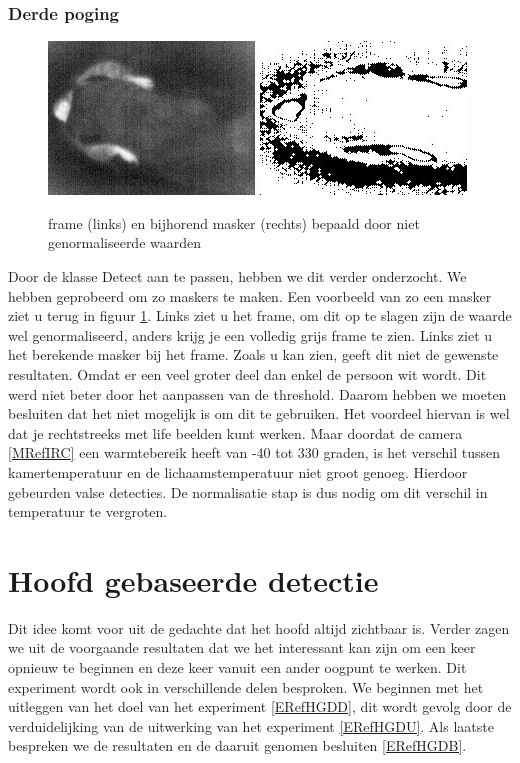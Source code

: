 \subsubsection{Derde poging}  
\begin{figure}[hbp]
	\includegraphics[scale = 0.75]{NotNormalizedFrame}
	\includegraphics[scale = 0.75]{NotNormalizedMask}
	\caption{frame (links) en bijhorend masker (rechts) bepaald door niet genormaliseerde waarden}
	\label{imgNGn}
\end{figure}

Door de klasse Detect aan te passen, hebben we dit verder onderzocht.  We hebben geprobeerd om zo maskers te maken. Een voorbeeld van zo een masker ziet u terug in figuur \ref{imgNGn}.  Links ziet u het frame, om dit op te slagen zijn de waarde wel genormaliseerd, anders krijg je een volledig grijs frame te zien. Links ziet u het berekende masker bij het frame.  Zoals u kan zien, geeft dit niet de gewenste resultaten. Omdat er een veel groter deel dan enkel de persoon wit wordt. Dit werd niet beter door het aanpassen van de threshold. Daarom hebben we moeten besluiten dat het niet mogelijk is om dit te gebruiken. Het voordeel hiervan is wel dat je rechtstreeks met life beelden kunt werken. Maar doordat de camera \ref{MRefIRC} een warmtebereik heeft van -40 tot 330 graden, is het verschil tussen kamertemperatuur en de lichaamstemperatuur niet groot genoeg. Hierdoor gebeurden valse detecties. De normalisatie stap is dus nodig om dit verschil in temperatuur te vergroten.
 
 \section{Hoofd gebaseerde detectie}
 \label{ERefHGD}
 Dit idee komt voor uit de gedachte dat het hoofd altijd zichtbaar is. Verder zagen we uit de voorgaande resultaten dat we het interessant kan zijn om een keer opnieuw te beginnen en deze keer vanuit een ander oogpunt te werken. Dit experiment wordt ook in verschillende delen besproken. We beginnen met het uitleggen van het doel van het experiment \ref{ERefHGDD}, dit wordt gevolg door de verduidelijking van de uitwerking van het experiment \ref{ERefHGDU}. Als laatste bespreken we de resultaten en de daaruit genomen besluiten \ref{ERefHGDB}.
 
